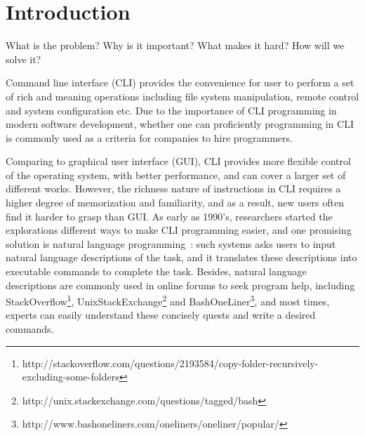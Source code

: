 \section{Introduction}

What is the problem?
Why is it important?
What makes it hard?
How will we solve it?

Command line interface (CLI) provides the convenience for user to perform a set of rich and meaning operations including file system manipulation, remote control and system configuration etc. Due to the importance of CLI programming in modern software development, whether one can proficiently programming in CLI is commonly used as a criteria for companies to hire programmers. 

Comparing to graphical user interface (GUI), CLI provides more flexible control of the operating system, with better performance, and can cover a larger set of different works. However, the richness nature of instructions in CLI requires a higher degree of memorization and familiarity, and as a result, new users often find it harder to grasp than GUI. As early as 1990's, researchers started the explorations different ways to make CLI programming easier, and one promising solution is natural language programming~\cite{Pederson-Report,Manaris:1994:DNL:198125.198137,ZOLTANFORD1991527}: such systems asks users to input natural language descriptions of the task, and it translates these descriptions into executable commands to complete the task. Besides, natural language descriptions are commonly used in online forums to seek program help, including StackOverflow\footnote{http://stackoverflow.com/questions/2193584/copy-folder-recursively-excluding-some-folders}, UnixStackExchange\footnote{http://unix.stackexchange.com/questions/tagged/bash} and BashOneLiner\footnote{http://www.bashoneliners.com/oneliners/oneliner/popular/}, and most times, experts can easily understand these concisely quests and write a desired commands.


